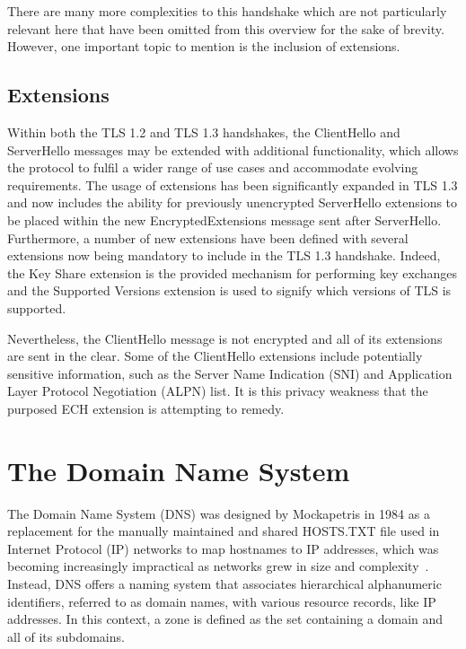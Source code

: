 There are many more complexities to this handshake which are not particularly relevant here that have been omitted from this overview for the sake of brevity. However, one important topic to mention is the inclusion of extensions.

\subsection{Extensions}

Within both the TLS 1.2 and TLS 1.3 handshakes, the ClientHello and ServerHello messages may be extended with additional functionality, which allows the protocol to fulfil a wider range of use cases and accommodate evolving requirements. The usage of extensions has been significantly expanded in TLS 1.3 and now includes the ability for previously unencrypted ServerHello extensions to be placed within the new EncryptedExtensions message sent after ServerHello. Furthermore, a number of new extensions have been defined with several extensions now being mandatory to include in the TLS 1.3 handshake. Indeed, the Key Share extension is the provided mechanism for performing key exchanges and the Supported Versions extension is used to signify which versions of TLS is supported.

Nevertheless, the ClientHello message is not encrypted and all of its extensions are sent in the clear. Some of the ClientHello extensions include potentially sensitive information, such as the Server Name Indication (SNI) and Application Layer Protocol Negotiation (ALPN) list. It is this privacy weakness that the purposed ECH extension is attempting to remedy.









\section{The Domain Name System}

The Domain Name System (DNS) was designed by Mockapetris in 1984 as a replacement for the manually maintained and shared HOSTS.TXT file used in Internet Protocol (IP) networks to map hostnames to IP addresses, which was becoming increasingly impractical as networks grew in size and complexity~\cite{rfc1034, rfc1035}. Instead, DNS offers a naming system that associates hierarchical alphanumeric identifiers, referred to as domain names, with various resource records, like IP addresses. In this context, a zone is defined as the set containing a domain and all of its subdomains.

